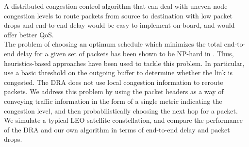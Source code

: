 \documentclass[10pt,conference, final, letterpaper]{IEEEtran}
\begin{document}
A distributed congestion control algorithm that can deal with uneven node congestion levels to route packets from source to destination with low packet drops and end-to-end delay would be easy to implement on-board, and would offer better QoS. \\
The problem of choosing an optimum schedule which minimizes the total end-to-end delay for a given set of packets has been shown to be NP-hard in \cite{opt_schedule}. Thus, heuristics-based approaches have been used to tackle this problem. In particular, \cite{ekici-datagram}\cite{ekici-dist} use a basic threshold on the outgoing buffer to determine whether the link is congested. The DRA does not use local congestion information to reroute packets. We address this problem by using the packet headers as a way of conveying traffic information in the form of a single metric indicating the congestion level, and then probabilistically choosing the next hop for a packet. We simulate a typical LEO satellite constellation, and compare the performance of the DRA and our own algorithm in terms of end-to-end delay and packet drops. 
\end{document}
